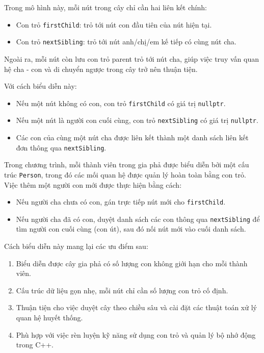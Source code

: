 Trong mô hình này, mỗi nút trong cây chỉ cần hai liên kết chính:
\begin{itemize}
	\item Con trỏ \texttt{firstChild}: trỏ tới nút con đầu tiên của nút hiện tại.
	\item Con trỏ \texttt{nextSibling}: trỏ tới nút anh/chị/em kế tiếp có cùng nút cha.
\end{itemize}

Ngoài ra, mỗi nút còn lưu con trỏ parent trỏ tới nút cha, giúp việc truy vấn quan hệ cha - con và di chuyển ngược trong cây trở nên thuận tiện.



Với cách biểu diễn này:
\begin{itemize}
	\item Nếu một nút không có con, con trỏ \texttt{firstChild} có giá trị \texttt{nullptr}.
	\item Nếu một nút là người con cuối cùng, con trỏ \texttt{nextSibling} có giá trị \texttt{nullptr}.
	\item Các con của cùng một nút cha được liên kết thành một danh sách liên kết đơn thông qua \texttt{nextSibling}.
\end{itemize}

Trong chương trình, mỗi thành viên trong gia phả được biểu diễn bởi một cấu trúc \texttt{Person}, trong đó các mối quan hệ được quản lý hoàn toàn bằng con trỏ. Việc thêm một người con mới được thực hiện bằng cách:
\begin{itemize}
	\item Nếu người cha chưa có con, gán trực tiếp nút mới cho \texttt{firstChild}.
	\item Nếu người cha đã có con, duyệt danh sách các con thông qua \texttt{nextSibling} để tìm người con cuối cùng (con út), sau đó nối nút mới vào cuối danh sách.
\end{itemize}


Cách biểu diễn này mang lại các ưu điểm sau:
\begin{enumerate}
	\item Biểu diễn được cây gia phả có số lượng con không giới hạn cho mỗi thành viên.
	\item Cấu trúc dữ liệu gọn nhẹ, mỗi nút chỉ cần số lượng con trỏ cố định.
	\item Thuận tiện cho việc duyệt cây theo chiều sâu và cài đặt các thuật toán xử lý quan hệ huyết thống.
	\item Phù hợp với việc rèn luyện kỹ năng sử dụng con trỏ và quản lý bộ nhớ động trong C++.
\end{enumerate}

